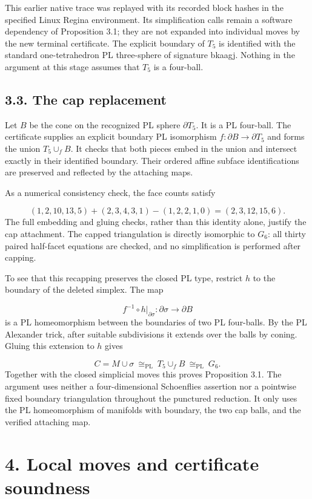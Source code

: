 \documentclass[11pt,letterpaper]{article}
\begin{document}
This earlier native trace was replayed with its recorded block hashes in the specified Linux Regina environment. Its simplification calls remain a software dependency of Proposition 3.1; they are not expanded into individual moves by the new terminal certificate. The explicit boundary of $T_5$ is identified with the standard one-tetrahedron PL three-sphere of signature bkaagj. Nothing in the argument at this stage assumes that $T_5$ is a four-ball.

\subsection*{3.3. The cap replacement}
Let $B$ be the cone on the recognized PL sphere $\partial T_5$. It is a PL four-ball. The certificate supplies an explicit boundary PL isomorphism $f:\partial B\longrightarrow\partial T_5$ and forms the union $T_5\cup_f B$. It checks that both pieces embed in the union and intersect exactly in their identified boundary. Their ordered affine subface identifications are preserved and reflected by the attaching maps.

As a numerical consistency check, the face counts satisfy

\[
(1,2,10,13,5)+(2,3,4,3,1)-(1,2,2,1,0)=(2,3,12,15,6).
\]
The full embedding and gluing checks, rather than this identity alone, justify the cap attachment. The capped triangulation is directly isomorphic to $G_6$: all thirty paired half-facet equations are checked, and no simplification is performed after capping.

To see that this recapping preserves the closed PL type, restrict $h$ to the boundary of the deleted simplex. The map

\[
f^{-1}\circ h|_{\partial\sigma}:\partial\sigma\longrightarrow\partial B
\]
is a PL homeomorphism between the boundaries of two PL four-balls. By the PL Alexander trick, after suitable subdivisions it extends over the balls by coning. Gluing this extension to $h$ gives

\[
C=M\cup\sigma\ \cong_{\mathrm{PL}}\ T_5\cup_f B\ \cong_{\mathrm{PL}}\ G_6.
\]
Together with the closed simplicial moves this proves Proposition 3.1. The argument uses neither a four-dimensional Schoenflies assertion nor a pointwise fixed boundary triangulation throughout the punctured reduction. It only uses the PL homeomorphism of manifolds with boundary, the two cap balls, and the verified attaching map.

\section*{4. Local moves and certificate soundness}
\end{document}
